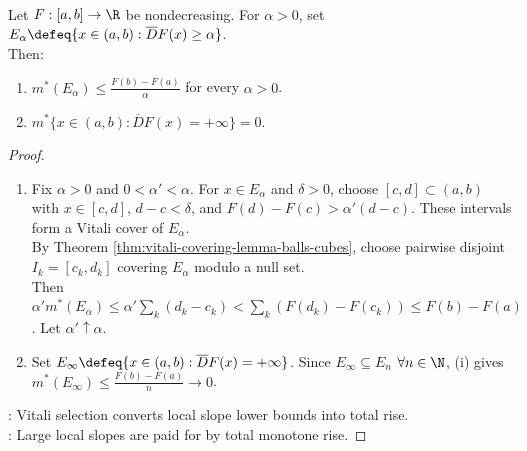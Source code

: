 \begin{lemma} \label{lem:monotone-upper-derivative-weak-bound} \\
Let $F:[a,b]\to\R$ be nondecreasing. For $\alpha>0$, set $E_\alpha\defeq\{x\in(a,b):\overline{D}F(x)\geq\alpha\}$.\\
Then:
\begin{enumerate}[label=(\roman*)]
\setlength{\itemsep}{0pt}
\item $m^\ast(E_\alpha)\leq\frac{F(b)-F(a)}{\alpha}$ for every $\alpha>0$.
\item $m^\ast\{x\in(a,b):\overline{D}F(x)=+\infty\}=0$.
\end{enumerate}
\begin{proof}
\begin{enumerate}[label=(\roman*)]
\setlength{\itemsep}{0pt}
\item Fix $\alpha>0$ and $0<\alpha'<\alpha$. For $x\in E_\alpha$ and $\delta>0$, choose $[c,d]\subset(a,b)$ with $x\in[c,d]$, $d-c<\delta$, and $F(d)-F(c)>\alpha'(d-c)$. These intervals form a Vitali cover of $E_\alpha$.\\
By Theorem \ref{thm:vitali-covering-lemma-balls-cubes}, choose pairwise disjoint $I_k=[c_k,d_k]$ covering $E_\alpha$ modulo a null set.\\
Then $\alpha'm^\ast(E_\alpha)\leq\alpha'\sum\limits_k(d_k-c_k)<\sum\limits_k(F(d_k)-F(c_k))\leq F(b)-F(a)$. Let $\alpha'\uparrow\alpha$.
\item Set $E_\infty\defeq\{x\in(a,b):\overline{D}F(x)=+\infty\}$. Since $E_\infty\subseteq E_n$ $\forall n\in\N$, (i) gives $m^\ast(E_\infty)\leq\frac{F(b)-F(a)}{n}\to0$.
\end{enumerate}
: Vitali selection converts local slope lower bounds into total rise.\\
: Large local slopes are paid for by total monotone rise.
\end{proof}
\end{lemma}

